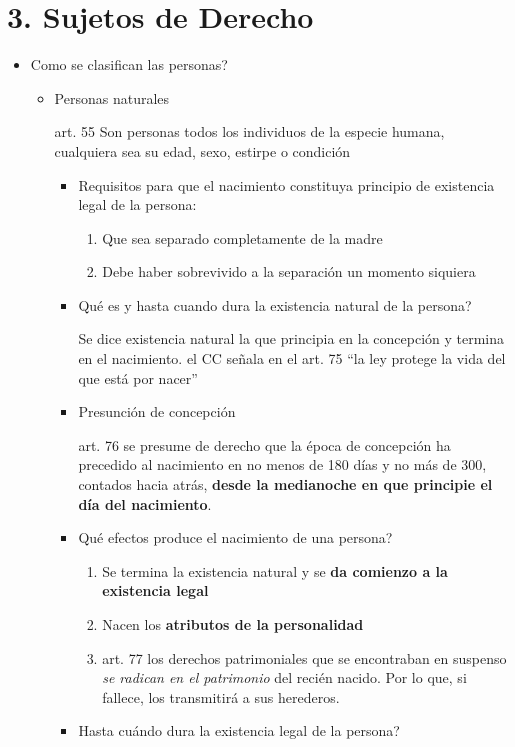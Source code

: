 \documentclass[]{article}
\providecommand{\tightlist}{%
  \setlength{\itemsep}{0pt}\setlength{\parskip}{0pt}}
\begin{document}
\hypertarget{sujetos-de-derecho}{%
\section{3. Sujetos de Derecho}\label{sujetos-de-derecho}}

\begin{itemize}
\tightlist
\item
  Como se clasifican las personas?

  \begin{itemize}
  \item
    Personas naturales

    art. 55 Son personas todos los individuos de la especie humana,
    cualquiera sea su edad, sexo, estirpe o condición

    \begin{itemize}
    \item
      Requisitos para que el nacimiento constituya principio de
      existencia legal de la persona:

      \begin{enumerate}
      \def\labelenumi{\arabic{enumi}.}
      \tightlist
      \item
        Que sea separado completamente de la madre
      \item
        Debe haber sobrevivido a la separación un momento siquiera
      \end{enumerate}
    \item
      Qué es y hasta cuando dura la existencia natural de la persona?

      Se dice existencia natural la que principia en la concepción y
      termina en el nacimiento. el CC señala en el art. 75 ``la ley
      protege la vida del que está por nacer''
    \item
      Presunción de concepción

      art. 76 se presume de derecho que la época de concepción ha
      precedido al nacimiento en no menos de 180 días y no más de 300,
      contados hacia atrás, \textbf{desde la medianoche en que principie
      el día del nacimiento}.
    \item
      Qué efectos produce el nacimiento de una persona?

      \begin{enumerate}
      \def\labelenumi{\arabic{enumi}.}
      \tightlist
      \item
        Se termina la existencia natural y se \textbf{da comienzo a la
        existencia legal}
      \item
        Nacen los \textbf{atributos de la personalidad}
      \item
        art. 77 los derechos patrimoniales que se encontraban en
        suspenso \emph{se radican en el patrimonio} del recién nacido.
        Por lo que, si fallece, los transmitirá a sus herederos.
      \end{enumerate}
    \item
      Hasta cuándo dura la existencia legal de la persona?


\end{itemize}
\end{itemize}
\end{itemize}
\end{document}

